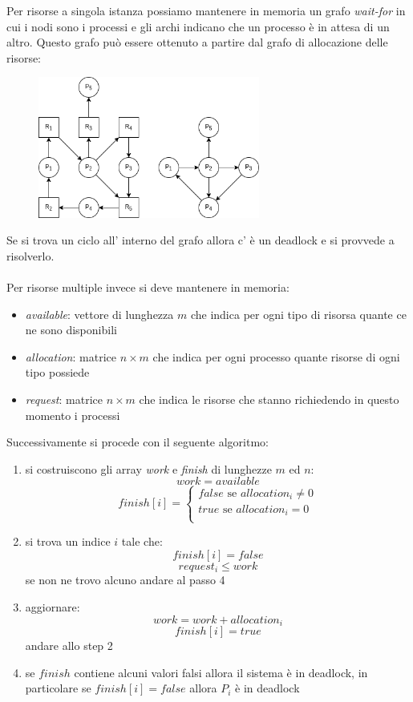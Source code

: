 Per risorse a singola istanza possiamo mantenere in memoria un grafo \emph{wait-for} in cui i nodi sono i processi e gli archi indicano che un processo è in attesa di un altro. Questo grafo può essere ottenuto a partire dal grafo di allocazione delle risorse:
\begin{figure}[H]
    \centering
    \includegraphics[width=275px]{images/8_Deadlock/wait_for_graph.png}
\end{figure}
Se si trova un ciclo all' interno del grafo allora c' è un deadlock e si provvede a risolverlo.
\\
\\
Per risorse multiple invece si deve mantenere in memoria:
\begin{itemize}
    \item \emph{available}: vettore di lunghezza $m$ che indica per ogni tipo di risorsa quante ce ne sono disponibili
    \item \emph{allocation}: matrice $n \times m$ che indica per ogni processo quante risorse di ogni tipo possiede
    \item \emph{request}: matrice $n \times m$ che indica le risorse che stanno richiedendo in questo momento i processi
\end{itemize}
Successivamente si procede con il seguente algoritmo:
\begin{enumerate}
    \item si costruiscono gli array \emph{work} e \emph{finish} di lunghezze $m$ ed $n$:
    $$ work = available $$
    \begin{equation}
        finish[i] = 
        \begin{cases}
            false \text{ se $allocation_i$} \neq 0 \\
            true \text{ se $allocation_i$} = 0 \\
        \end{cases}
    \end{equation}
    
    \item si trova un indice $i$ tale che:
    $$ finish[i] = false $$
    $$ request_i \leq work $$
    se non ne trovo alcuno andare al passo 4
    
    \item aggiornare:
    $$ work = work + allocation_i $$
    $$ finish[i] = true $$
    andare allo step 2
    
    \item se $finish$ contiene alcuni valori falsi allora il sistema è in deadlock, in particolare se $finish[i] = false$ allora $P_i$ è in deadlock 
\end{enumerate}
